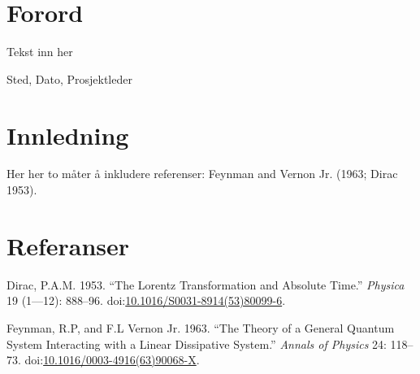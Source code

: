 \documentclass[11pt, a4paper]{article}
\begin{document}
\clearpage
\doublespacing
\tableofcontents
{}
\singlespacing
\clearpage

\section{Forord}

\normalsize
Tekst inn her\par
\medskip
Sted, Dato, Prosjektleder



\clearpage
\setcounter{secnumdepth}{1}


\section{Innledning}\label{innledning}

Her her to måter å inkludere referenser: Feynman and Vernon Jr. (1963;
Dirac 1953). \blindtext[8]

\newpage

\section*{Referanser}\label{references}

\hypertarget{refs}{}
\hypertarget{ref-Dirac1953888}{}
Dirac, P.A.M. 1953. ``The Lorentz Transformation and Absolute Time.''
\emph{Physica} 19 (1---12): 888--96.
doi:\href{https://doi.org/10.1016/S0031-8914(53)80099-6}{10.1016/S0031-8914(53)80099-6}.

\hypertarget{ref-Feynman1963118}{}
Feynman, R.P, and F.L Vernon Jr. 1963. ``The Theory of a General Quantum
System Interacting with a Linear Dissipative System.'' \emph{Annals of
Physics} 24: 118--73.
doi:\href{https://doi.org/10.1016/0003-4916(63)90068-X}{10.1016/0003-4916(63)90068-X}.





\end{document}
